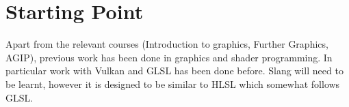 \section*{Starting Point}

Apart from the relevant courses (Introduction to graphics, Further
Graphics, AGIP),
previous work has been done in graphics and shader programming. In particular
work with Vulkan and GLSL has been done before. Slang will need to be learnt,
however it is designed to be similar to HLSL which somewhat follows GLSL.
